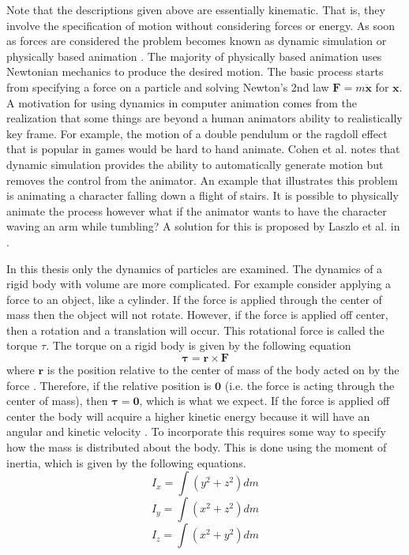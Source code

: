 Note that the descriptions given above are essentially kinematic. That is, they
involve the specification of motion without considering forces or energy. As
soon as forces are considered the problem becomes known as dynamic simulation or
physically based animation \cite{Watt, Eberly}. The majority of physically based
animation uses Newtonian mechanics to produce the desired motion. The basic
process starts from specifying a force on a particle and solving Newton's 2nd
law $\mathbf{F} = m\ddot{\mathbf{x}}$ for $\mathbf{x}$. A motivation for using
dynamics in computer animation comes from the realization that some things are
beyond a human animators ability to realistically key frame. For example, the
motion of a double pendulum or the ragdoll effect that is popular in games would
be hard to hand animate. Cohen et al. \cite{Cohen} notes that dynamic simulation
provides the ability to automatically generate motion but removes the control
from the animator. An example that illustrates this problem is animating a
character falling down a flight of stairs. It is possible to physically animate
the process however what if the animator wants to have the character waving an
arm while tumbling? A solution for this is proposed by Laszlo et al. in
\cite{InteractiveControl}.

In this thesis only the dynamics of particles are examined. The 
dynamics of a rigid body with volume are more complicated. For example consider
applying a force to an object, like a cylinder. If the force is applied
through the center of mass then the object will not rotate. However, if the
force is applied off center, then a rotation and a translation will occur. This
rotational force is called the torque $\tau$. The torque on a rigid body is 
given by the following equation
\begin{equation}
	\label{Eqn:Torque}
	\mathbf{\tau} = \mathbf{r} \times \mathbf{F}
\end{equation}
where $\mathbf{r}$ is the position relative to the center of mass of the body
acted on by the force \cite{Otte}. Therefore, if the relative position is
$\mathbf{0}$ (i.e. the force is acting through the center of mass), then
$\mathbf{\tau} = \mathbf{0}$, which is what we expect. If the force is applied
off center the body will acquire a higher kinetic energy because it will
have an angular and kinetic velocity \cite{Watt}. To incorporate this requires
some way to specify how the mass is distributed about the body. This is done
using the moment of inertia, which is given by the following equations.
\[
I_x = \int (y^2 + z^2)dm
\]
\[
I_y = \int (x^2 + z^2)dm
\]
\[
I_z = \int (x^2 + y^2)dm
\]

